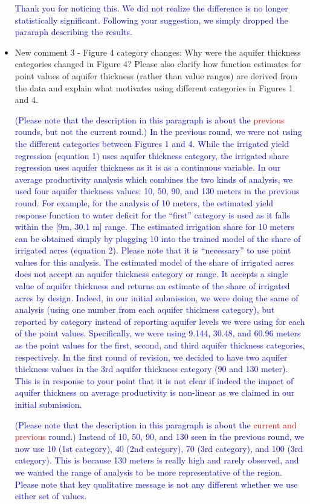 \documentclass[
]{article}
\begin{document}
\begin{itemize}
    \textcolor{blue}{Thank you for noticing this. We did not realize the difference is no longer statistically significant. Following your suggestion, we simply dropped the pararaph describing the results.}

\item New comment 3 - Figure 4 category changes: Why were the aquifer thickness categories changed in Figure 4? Please also clarify how function estimates for point values of aquifer thickness (rather than value ranges) are derived from the data and explain what motivates using different categories in Figures 1 and 4.

    \textcolor{blue}{(Please note that the description in this paragraph is about the \textcolor{red}{previous} rounds, but not the current round.) In the previous round, we were not using the different categories between Figures 1 and 4. While the irrigated yield regression (equation 1) uses aquifer thickness category, the irrigated share regression uses aquifer thickness as it is as a continuous variable. In our average productivity analysis which combines the two kinds of analysis, we used four aquifer thickness values: 10, 50, 90, and 130 meters in the previous round. For example, for the analysis of 10 meters, the estimated yield response function to water deficit for the ``first'' category is used as it falls within the [9m, 30.1 m] range. The estimated irrigation share for 10 meters can be obtained simply by plugging 10 into the trained model of the share of irrigated acres (equation 2). Please note that it is ``necessary'' to use point values for this analysis. The estimated model of the share of irrigated acres does not accept an aquifer thickness category or range. It accepts a single value of aquifer thickness and returns an estimate of the share of irrigated acres by design. Indeed, in our initial submission, we were doing the same of analysis (using one number from each aquifer thickness category), but reported by category instead of reporting aquifer levels we were using for each of the point values. Specifically, we were using 9.144, 30.48, and 60.96 meters as the point values for the first, second, and third aquifer thickness categories, respectively. In the first round of revision, we decided to have two aquifer thickness values in the 3rd aquifer thickness category (90 and 130 meter). This is in response to your point that it is not clear if indeed the impact of aquifer thickness on average productivity is non-linear as we claimed in our initial submission.}

    \textcolor{blue}{(Please note that the description in this paragraph is about the \textcolor{red}{current and previous} round.) Instead of 10, 50, 90, and 130 seen in the previous round, we now use 10 (1st category), 40 (2nd category), 70 (3rd category), and 100 (3rd category). This is because 130 meters is really high and rarely observed, and we wanted the range of analysis to be more representative of the region. Please note that key qualitative message is not any different whether we use either set of values.}


\end{itemize}
\end{document}
